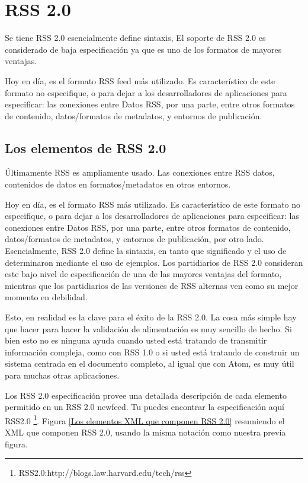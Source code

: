\section{RSS 2.0}

Se tiene RSS 2.0 esencialmente define sintaxis, El soporte de RSS 2.0 es considerado
de baja especificaci\'{o}n ya que es uno de los formatos de mayores ventajas.

Hoy en d\'{i}a, es el formato RSS feed m\'{a}s utilizado. Es caracter\'{i}stico de
este formato no especifique, o para dejar a los desarrolladores de aplicaciones para
especificar: las conexiones entre Datos RSS, por una parte, entre otros formatos de
contenido, datos/formatos de metadatos, y entornos de publicaci\'{o}n.\cite{wittenbrink2005rss}

\subsection{Los elementos de RSS 2.0}

\'{U}ltimamente RSS es ampliamente usado. Las conexiones entre RSS datos, contenidos
de datos en formatos/metadatos en otros entornos.

Hoy en d\'{i}a, es el formato RSS m\'{a}s utilizado. Es caracter\'{i}stico de este
formato no especifique, o para dejar a los desarrolladores de aplicaciones para 
especificar: las conexiones entre Datos RSS, por una parte, entre otros formatos
de contenido, datos/formatos de metadatos, y entornos de publicaci\'{o}n, por otro
lado. Esencialmente, RSS 2.0 define la sintaxis, en tanto que significado y el uso
de determinaron mediante el uso de ejemplos. Los partidiarios de RSS 2.0 consideran
este bajo nivel de especificaci\'{o}n de una de las mayores ventajas del formato, 
mientras que los partidiarios de las versiones de RSS alternas ven como su mejor
momento en debilidad.\cite{wittenbrink2005rss}

Esto, en realidad es la clave para el \'{e}xito de la RSS 2.0. La cosa m\'{a}s simple
hay que hacer para hacer la validaci\'{o}n de alimentaci\'{o}n es muy sencillo de 
hecho. Si bien esto no es ninguna ayuda cuando usted est\'{a}
tratando de transmitir informaci\'{o}n compleja, como con RSS 1.0 o si usted est\'{a}
tratando de construir un sistema centrada en el documento completo, al igual que con
Atom, es muy \'{u}til para muchas otras aplicaciones.\cite{hammersley2005developing}

Los RSS 2.0 especificaci\'{o}n provee una detallada descripci\'{o}n de cada elemento 
permitido en un RSS 2.0 newfeed. Tu puedes encontrar la especificaci\'{o}n aqu\'{i} 
RSS2.0 \footnote{RSS2.0:http://blogs.law.harvard.edu/tech/rss}. Figura \ref{Los 
elementos XML que componen RSS 2.0} resumiendo el XML que componen RSS 2.0, 
usando la misma notaci\'{o}n como nuestra previa figura.\cite{johnson2006rss}


